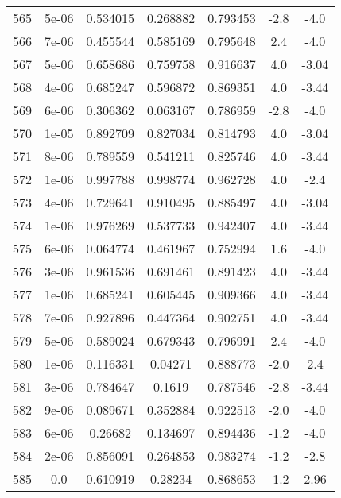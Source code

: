 \begin{table}
\begin{tabular}{c|c|c|c|c|c|c}
565 & 5e-06 & 0.534015 & 0.268882 & 0.793453 & -2.8 & -4.0\\
566 & 7e-06 & 0.455544 & 0.585169 & 0.795648 & 2.4 & -4.0\\
567 & 5e-06 & 0.658686 & 0.759758 & 0.916637 & 4.0 & -3.04\\
568 & 4e-06 & 0.685247 & 0.596872 & 0.869351 & 4.0 & -3.44\\
569 & 6e-06 & 0.306362 & 0.063167 & 0.786959 & -2.8 & -4.0\\
570 & 1e-05 & 0.892709 & 0.827034 & 0.814793 & 4.0 & -3.04\\
571 & 8e-06 & 0.789559 & 0.541211 & 0.825746 & 4.0 & -3.44\\
572 & 1e-06 & 0.997788 & 0.998774 & 0.962728 & 4.0 & -2.4\\
573 & 4e-06 & 0.729641 & 0.910495 & 0.885497 & 4.0 & -3.04\\
574 & 1e-06 & 0.976269 & 0.537733 & 0.942407 & 4.0 & -3.44\\
575 & 6e-06 & 0.064774 & 0.461967 & 0.752994 & 1.6 & -4.0\\
576 & 3e-06 & 0.961536 & 0.691461 & 0.891423 & 4.0 & -3.44\\
577 & 1e-06 & 0.685241 & 0.605445 & 0.909366 & 4.0 & -3.44\\
578 & 7e-06 & 0.927896 & 0.447364 & 0.902751 & 4.0 & -3.44\\
579 & 5e-06 & 0.589024 & 0.679343 & 0.796991 & 2.4 & -4.0\\
580 & 1e-06 & 0.116331 & 0.04271 & 0.888773 & -2.0 & 2.4\\
581 & 3e-06 & 0.784647 & 0.1619 & 0.787546 & -2.8 & -3.44\\
582 & 9e-06 & 0.089671 & 0.352884 & 0.922513 & -2.0 & -4.0\\
583 & 6e-06 & 0.26682 & 0.134697 & 0.894436 & -1.2 & -4.0\\
584 & 2e-06 & 0.856091 & 0.264853 & 0.983274 & -1.2 & -2.8\\
585 & 0.0 & 0.610919 & 0.28234 & 0.868653 & -1.2 & 2.96\\
\end{tabular}
\end{table}
\newpage
